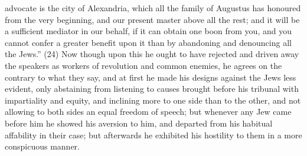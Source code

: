 advocate is the city of Alexandria, which all the family of Augustus has honoured from the very
beginning, and our present master above all the rest; and it will be a sufficient mediator in our
behalf, if it can obtain one boon from you, and you cannot confer a greater benefit upon it than by
abandoning and denouncing all the Jews.'' (24) Now though upon this he ought to have rejected
and driven away the speakers as workers of revolution and common enemies, he agrees on the
contrary to what they say, and at first he made his designs against the Jews less evident, only
abstaining from listening to causes brought before his tribunal with impartiality and equity, and
inclining more to one side than to the other, and not allowing to both sides an equal freedom of
speech; but whenever any Jew came before him he showed his aversion to him, and departed
from his habitual affability in their case; but afterwards he exhibited his hostility to them in a more
conspicuous manner.

